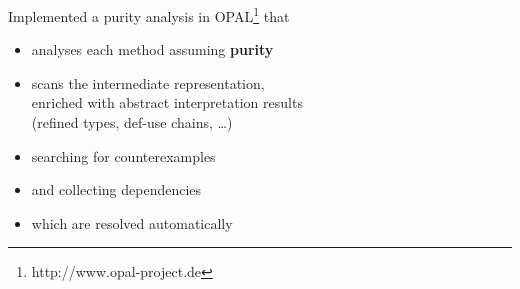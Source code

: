 \documentclass{beamer}
\begin{document}
\begin{frame}
\begin{overlayarea}{\textwidth}{0.8\textheight}
\vspace{4mm}
Implemented a purity analysis in OPAL\footnote[frame]{http://www.opal-project.de} that
\begin{itemize}
	\item analyses each method assuming \textbf{purity}
	\item scans the intermediate representation,\\ enriched with abstract interpretation results\\ (refined types, def-use chains, \dots)
	\item searching for counterexamples
	\item and collecting dependencies
	\item<3> which are resolved automatically
\end{itemize}
\end{overlayarea}
\end{frame}
\end{document}
